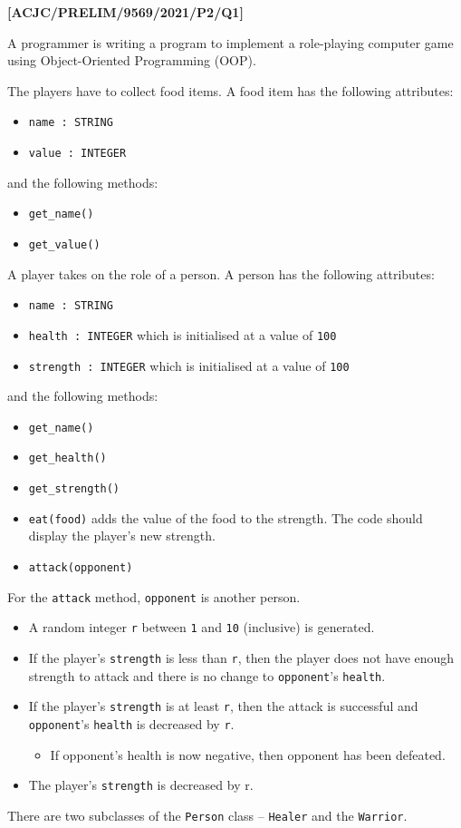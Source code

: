 \item \textbf{{[}ACJC/PRELIM/9569/2021/P2/Q1{]} }

A programmer is writing a program to implement a role-playing computer
game using Object-Oriented Programming (OOP).

The players have to collect food items. A food item has the following
attributes:
\begin{itemize}
\item \texttt{name : STRING }
\item \texttt{value : INTEGER}
\end{itemize}
and the following methods:
\begin{itemize}
\item \texttt{get\_name() }
\item \texttt{get\_value()}
\end{itemize}
A player takes on the role of a person. A person has the following
attributes:
\begin{itemize}
\item \texttt{name : STRING }
\item \texttt{health : INTEGER} which is initialised at a value of \texttt{100}
\item \texttt{strength : INTEGER} which is initialised at a value of \texttt{100}
\end{itemize}
and the following methods:
\begin{itemize}
\item \texttt{get\_name() }
\item \texttt{get\_health() }
\item \texttt{get\_strength() }
\item \texttt{eat(food)} adds the value of the food to the strength. The
code should display the player\textquoteright s new strength. 
\item \texttt{attack(opponent)}
\end{itemize}
For the \texttt{attack} method, \texttt{opponent} is another person.
\begin{itemize}
\item A random integer \texttt{r} between \texttt{1} and \texttt{10} (inclusive)
is generated. 
\item If the player\textquoteright s \texttt{strength} is less than \texttt{r},
then the player does not have enough strength to attack and there
is no change to \texttt{opponent}\textquoteright s \texttt{health}. 
\item If the player\textquoteright s \texttt{strength} is at least \texttt{r},
then the attack is successful and \texttt{opponent}\textquoteright s
\texttt{health} is decreased by \texttt{r}. 
\begin{itemize}
\item If opponent\textquoteright s health is now negative, then opponent
has been defeated. 
\end{itemize}
\item The player\textquoteright s \texttt{strength} is decreased by r.
\end{itemize}
There are two subclasses of the \texttt{Person} class -- \texttt{Healer}
and the \texttt{Warrior}.

